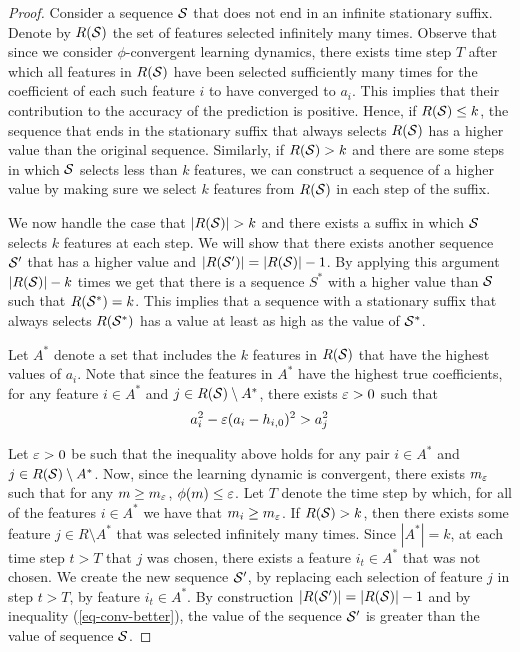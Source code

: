 \begin{proof}
Consider a sequence $\mathcal{S}$ that does not end in an infinite stationary suffix. Denote by \(R(\mathcal{S})\) the set of features selected infinitely many times. Observe that since we consider $\phi$-convergent learning dynamics, there exists time step $T$ after which all features in $R(\mathcal{S})$ have been selected sufficiently many times for the coefficient of each such feature $i$ to have converged to $a_i$. This implies that their contribution to the accuracy of the prediction is  positive. Hence, if $R(\mathcal{S}) \leq k$, the sequence that ends in the stationary suffix that always selects $R(\mathcal{S})$ has a higher value than the original sequence. Similarly, if $R(\mathcal{S}) > k$ and there are some steps in which $\mathcal{S}$ selects less than $k$ features, we can construct a sequence of a higher value by making sure we select $k$ features from $R(\mathcal{S})$ in each step of the suffix. 
 
We now handle the case that $|R(\seq{S})|>k$ and there exists a suffix in which $\mathcal{S}$ selects $k$ features at each step. We will show that there exists another sequence $\mathcal{S}'$ that has a higher value and $|R(\mathcal{S}')|=|R(\mathcal{S})|-1$. By applying this argument $|R(\mathcal{S})|-k$ times we get that there is a sequence $S^*$ with a higher value than $\mathcal{S}$ such that $R(\mathcal{S}^*)=k$. This implies that a sequence with a stationary suffix that always selects $R(\mathcal{S}^*)$ has a value at least as high as the value of $\mathcal{S}^*$.

Let $A^*$ denote a set that includes the $k$ features in $R(\mathcal{S})$ that have the highest values of $a_i$. Note that since the features in $A^*$ have the highest true coefficients, for any feature $i \in A^*$ and $j \in R(\mathcal{S}) \setminus A^*$, there exists $\varepsilon>0$ such that
	\begin{align} \label{eq-conv-better}
		a_i^2-\varepsilon(a_i - h_{i,0})^2 >a_j^2
	\end{align}
    
	Let $\varepsilon>0$ be such that the inequality above holds for any pair $i \in A^*$ and $j \in R(\mathcal{S}) \setminus A^*$.  Now, since the learning dynamic is convergent, there exists $m_\varepsilon$ such that for any $m\geq m_\varepsilon$, $\phi(m) \leq \varepsilon$. Let $T$ denote the time step by which, for all of the features $i \in A^*$ we have that $m_i \geq m_\varepsilon$. If $R(\mathcal{S})>k$, then there exists some feature $j \in R \setminus A^*$ that was selected infinitely many times. Since $|A^*|=k$, at each time step $t>T$ that $j$ was chosen, there exists a feature $i_t \in A^*$ that was not chosen. We create the new sequence $\mathcal{S}'$, by replacing each selection of feature $j$ in step $t>T$, by feature $i_t \in A^*$. By construction $|R(\mathcal{S}')|=|R(\mathcal{S})|-1$ and by inequality (\ref{eq-conv-better}), the value of the sequence $\mathcal{S}'$ is greater than the value of sequence $\mathcal{S}$.
\end{proof} 





